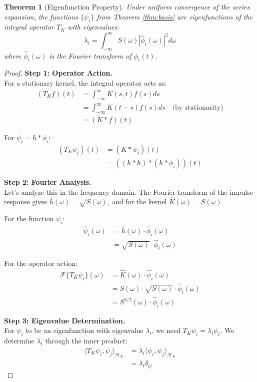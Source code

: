 \documentclass{article}
\newtheorem{theorem}{Theorem}
\begin{document}
\begin{theorem}[Eigenfunction Property]
\label{thm:eigenfunctions}
Under uniform convergence of the series expansion, the functions $\{\psi_i\}$ from Theorem \ref{thm:basis} are eigenfunctions of the integral operator $T_K$ with eigenvalues:
\begin{equation}
\lambda_i = \int_{-\infty}^{\infty} S(\omega)|\hat{\phi}_i(\omega)|^2 d\omega
\end{equation}
where $\hat{\phi}_i(\omega)$ is the Fourier transform of $\phi_i(t)$.
\end{theorem}

\begin{proof}
\textbf{Step 1: Operator Action.}\\
For a stationary kernel, the integral operator acts as:
\begin{align}
(T_K f)(t) &= \int_{-\infty}^{\infty} K(s,t)f(s)ds\\
&= \int_{-\infty}^{\infty} K(t-s)f(s)ds \quad \text{(by stationarity)}\\
&= (K * f)(t)
\end{align}

For $\psi_i = h * \phi_i$:
\begin{align}
(T_K \psi_i)(t) &= (K * \psi_i)(t)\\
&= ((h * h) * (h * \phi_i))(t)
\end{align}

\textbf{Step 2: Fourier Analysis.}\\
Let's analyze this in the frequency domain. The Fourier transform of the impulse response gives $\hat{h}(\omega) = \sqrt{S(\omega)}$, and for the kernel $\hat{K}(\omega) = S(\omega)$.

For the function $\psi_i$:
\begin{align}
\hat{\psi}_i(\omega) &= \hat{h}(\omega) \cdot \hat{\phi}_i(\omega)\\
&= \sqrt{S(\omega)} \cdot \hat{\phi}_i(\omega)
\end{align}

For the operator action:
\begin{align}
\mathcal{F}\{T_K \psi_i\}(\omega) &= \hat{K}(\omega) \cdot \hat{\psi}_i(\omega)\\
&= S(\omega) \cdot \sqrt{S(\omega)} \cdot \hat{\phi}_i(\omega)\\
&= S^{3/2}(\omega) \cdot \hat{\phi}_i(\omega)
\end{align}

\textbf{Step 3: Eigenvalue Determination.}\\
For $\psi_i$ to be an eigenfunction with eigenvalue $\lambda_i$, we need $T_K \psi_i = \lambda_i \psi_i$. We determine $\lambda_i$ through the inner product:
\begin{align}
\langle T_K \psi_i, \psi_j \rangle_{\mathcal{H}_K} &= \lambda_i \langle \psi_i, \psi_j \rangle_{\mathcal{H}_K}\\
&= \lambda_i \delta_{ij}
\end{align}


\end{proof}
\end{document}
